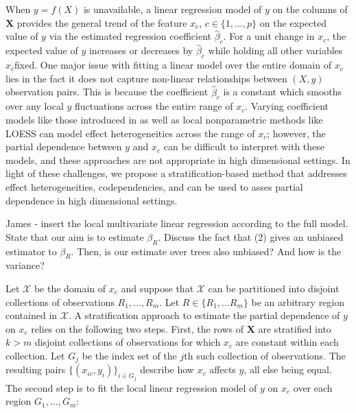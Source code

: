 \documentclass[12pt]{article}
\newcommand{\cut}[1]{}
\newcommand{\xnc}{$x_{\overline{c}}$}
\begin{document}
\cut{The partial derivative of $f(X)$ with respect to a single variable of interest $x_c$ describes how a unit change in $x_c$ affects $y$ for all $x_c$ values, treating all other variables as constants. Integrating the partial derivative $\frac{\partial}{\partial x_{c}} f(X)$ would yield a curve showing just $x_c$'s contribution to $y$. } When $y = f(X)$ is unavailable, a linear regression model of $y$ on the columns of $\mathbf{X}$ provides the general trend of the feature $x_c$, $c \in \{1, \ldots, p\}$ on the expected value of $y$ via the estimated regression coefficient $\widehat{\beta}_c$. For a unit change in $x_c$, the expected value of $y$ increases or decreases by $\widehat{\beta}_c$ while holding all other variables \xnc  fixed. One major issue with fitting a linear model over the entire domain of $x_c$ lies in the fact it does not capture non-linear relationships between $(X,y)$ observation pairs. This is because the coefficient $\widehat{\beta}_c$ is a constant which smooths over any local $y$ fluctuations across the entire range of $x_c$. Varying coefficient models like those introduced in \citet{fan2008statistical} as well as local nonparametric methods like LOESS \citep{cleveland1979robust, cleveland1981lowess, cleveland1988locally} can model effect heterogeneities across the range of $x_c$; however, the partial dependence between $y$ and $x_c$ can be difficult to interpret with these models, and these approaches are not appropriate in high dimensional settings. In light of these challenges, we propose a stratification-based method that addresses effect heterogeneities, codependencies, and can be used to asses partial dependence in high dimensional settings. \cut{Second, linear models require dummy variables to represent (and replace) categorical $x_c$ variables, therefore, regression coefficients would describe the relationship between the presence or absence of a single category and $y$, rather than $x_c$ and $y$. \color{red} Although I agree that categorical variables are an important consideration, many stats folks would not agree with this statement and are perfectly happy with its interpretation.}

{\color{red} James - insert the local multivariate linear regression according to the full model. State that our aim is to estimate $\beta_R$. Discuss the fact that (2) gives an unbiased estimator to $\beta_R$. Then, is our estimate over trees also unbiased? And how is the variance?}

Let $\mathcal{X}$ be the domain of $x_c$ and suppose that $\mathcal{X}$ can be partitioned into disjoint collections of observations $R_1, \ldots, R_m$. Let $R \in \{R_1, \ldots R_m\}$ be an arbitrary region contained in $\mathcal{X}.$ A stratification approach to estimate the partial dependence of $y$ on $x_c$ relies on the following two steps. First, the rows of $\mathbf{X}$ are stratified into $k > m$ disjoint collections of observations for which \xnc{} are constant within each collection. Let $G_j$ be the index set of the $j$th such collection of observations. The resulting pairs $\{(x_{ic},  y_i)\}_{i \in G_j}$ describe how $x_c$ affects $y$, all else being equal. The second step is to fit the local linear regression model of $y$ on $x_c$ over each region $G_1, \ldots, G_m:$
\end{document}
